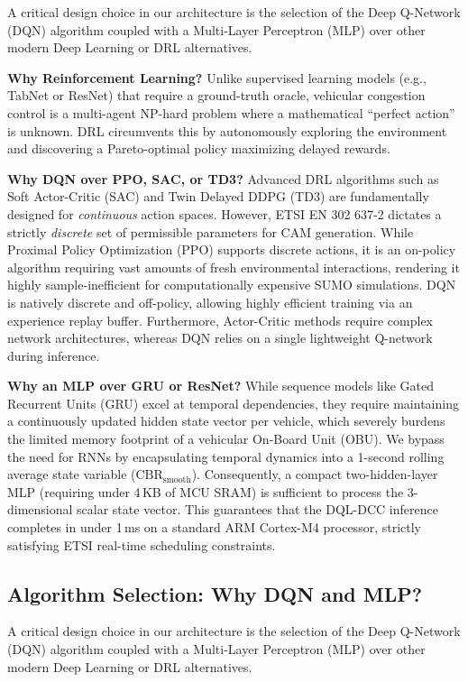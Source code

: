 \documentclass[journal]{IEEEtran}
\begin{document}
A critical design choice in our architecture is the selection of the Deep Q-Network (DQN) algorithm coupled with a Multi-Layer Perceptron (MLP) over other modern Deep Learning or DRL alternatives.

\textbf{Why Reinforcement Learning?} Unlike supervised learning models (e.g., TabNet or ResNet) that require a ground-truth oracle, vehicular congestion control is a multi-agent NP-hard problem where a mathematical ``perfect action'' is unknown. DRL circumvents this by autonomously exploring the environment and discovering a Pareto-optimal policy maximizing delayed rewards.

\textbf{Why DQN over PPO, SAC, or TD3?} Advanced DRL algorithms such as Soft Actor-Critic (SAC) and Twin Delayed DDPG (TD3) are fundamentally designed for \emph{continuous} action spaces. However, ETSI EN 302 637-2 dictates a strictly \emph{discrete} set of permissible parameters for CAM generation. While Proximal Policy Optimization (PPO) supports discrete actions, it is an on-policy algorithm requiring vast amounts of fresh environmental interactions, rendering it highly sample-inefficient for computationally expensive SUMO simulations. DQN is natively discrete and off-policy, allowing highly efficient training via an experience replay buffer. Furthermore, Actor-Critic methods require complex network architectures, whereas DQN relies on a single lightweight Q-network during inference.

\textbf{Why an MLP over GRU or ResNet?} While sequence models like Gated Recurrent Units (GRU) excel at temporal dependencies, they require maintaining a continuously updated hidden state vector per vehicle, which severely burdens the limited memory footprint of a vehicular On-Board Unit (OBU). We bypass the need for RNNs by encapsulating temporal dynamics into a 1-second rolling average state variable ($\text{CBR}_{\text{smooth}}$). Consequently, a compact two-hidden-layer MLP (requiring under 4\,KB of MCU SRAM) is sufficient to process the 3-dimensional scalar state vector. This guarantees that the DQL-DCC inference completes in under 1\,ms on a standard ARM Cortex-M4 processor, strictly satisfying ETSI real-time scheduling constraints.


\subsection{Algorithm Selection: Why DQN and MLP?}
\label{sec:justification}

A critical design choice in our architecture is the selection of the Deep Q-Network (DQN) algorithm coupled with a Multi-Layer Perceptron (MLP) over other modern Deep Learning or DRL alternatives.
\end{document}

